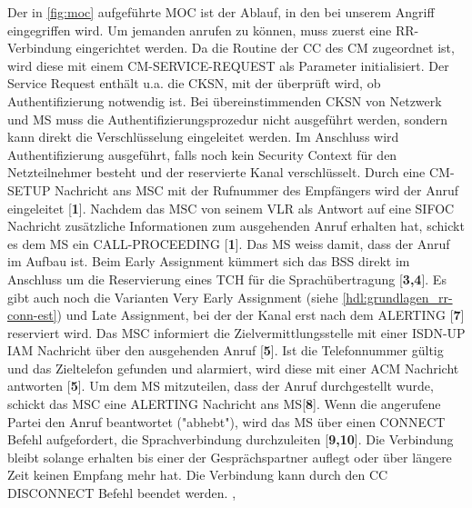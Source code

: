 Der in \autoref{fig:moc} aufgeführte \ac{MOC} ist der Ablauf, in den bei unserem Angriff eingegriffen wird. Um jemanden anrufen zu können, muss zuerst eine \ac{RR}-Verbindung eingerichtet werden. Da die Routine der \acl{CC} des \acl{CM} zugeordnet ist, wird diese mit einem CM-SERVICE-REQUEST als Parameter initialisiert. Der Service Request enthält u.a. die \ac{CKSN}, mit der überprüft wird, ob Authentifizierung notwendig ist.  Bei übereinstimmenden \ac{CKSN} von Netzwerk und \ac{MS} muss die Authentifizierungsprozedur nicht ausgeführt werden, sondern kann direkt die Verschlüsselung eingeleitet werden. Im Anschluss wird Authentifizierung ausgeführt, falls noch kein Security Context für den Netzteilnehmer besteht und der reservierte Kanal verschlüsselt. Durch eine CM-SETUP Nachricht ans \ac{MSC} mit der Rufnummer des Empfängers wird der Anruf eingeleitet [\textbf{1}]. Nachdem das \ac{MSC} von seinem \ac{VLR} als Antwort auf eine \ac{SIFOC} Nachricht  zusätzliche Informationen zum ausgehenden Anruf erhalten hat, schickt es dem \ac{MS} ein CALL-PROCEEDING [\textbf{1}]. Das \ac{MS} weiss damit, dass der Anruf im Aufbau ist. Beim Early Assignment kümmert sich das \ac{BSS} direkt im Anschluss um die Reservierung eines \ac{TCH} für die Sprachübertragung [\textbf{3,4}].  Es gibt auch noch die Varianten Very Early Assignment (siehe \autoref{hdl:grundlagen_rr-conn-est}) und Late Assignment, bei der der Kanal erst nach dem ALERTING [\textbf{7}] reserviert wird. Das MSC informiert die Zielvermittlungsstelle mit einer \ac{ISDN-UP} \ac{IAM} Nachricht über den ausgehenden Anruf [\textbf{5}]. Ist die Telefonnummer gültig und das Zieltelefon gefunden und alarmiert, wird diese mit einer \ac{ACM} Nachricht antworten [\textbf{5}]. Um dem \ac{MS} mitzuteilen, dass der Anruf durchgestellt wurde, schickt das \ac{MSC} eine ALERTING Nachricht ans \ac{MS}[\textbf{8}]. Wenn die angerufene Partei den Anruf beantwortet ("abhebt"), wird das MS über einen CONNECT Befehl aufgefordert, die Sprachverbindung durchzuleiten [\textbf{9,10}]. Die Verbindung bleibt solange erhalten bis einer der Gesprächspartner auflegt oder über längere Zeit keinen Empfang mehr hat. Die Verbindung kann durch den \ac{CC} DISCONNECT Befehl beendet werden. ,  

